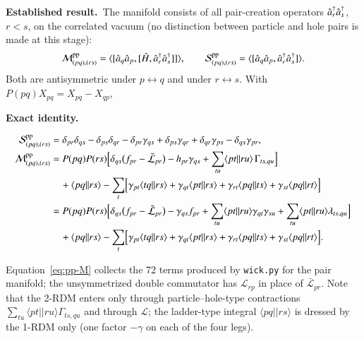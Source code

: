 \documentclass[aip,jcp,reprint,noshowkeys,superscriptaddress]{revtex4-1}
\newcommand{\cre}[1]{\Hat{a}_{#1}^{\dag}}
\newcommand{\ani}[1]{\Hat{a}_{#1}}
\newcommand{\pp}{\text{pp}}
\newcommand{\Lag}{\mathcal{L}}
\newcommand{\sLag}{\bar{\mathcal L}}
\newcommand{\Exact}{\textbf{Exact identity.}\ }
\newcommand{\Established}{\textbf{Established result.}\ }
\begin{document}
\Established The manifold consists of all pair-creation operators
$\cre{r}\cre{s}$, $r<s$, on the correlated vacuum (no distinction between
particle and hole pairs is made at this stage):
\begin{equation}
  \mathcal M^{\pp}_{(pq),(rs)}=\langle[\ani{q}\ani{p},[\hat H,\cre{r}\cre{s}]]\rangle,
  \qquad
  \mathcal S^{\pp}_{(pq),(rs)}=\langle[\ani{q}\ani{p},\cre{r}\cre{s}]\rangle .
  \label{eq:pp-def}
\end{equation}
Both are antisymmetric under $p\leftrightarrow q$ and under
$r\leftrightarrow s$.  With $P(pq)X_{pq}=X_{pq}-X_{qp}$,

\Exact
\begin{widetext}
\begin{align}
  \mathcal S^{\pp}_{(pq),(rs)}&=\delta_{pr}\delta_{qs}-\delta_{ps}\delta_{qr}
  -\delta_{pr}\gamma_{qs}+\delta_{ps}\gamma_{qr}+\delta_{qr}\gamma_{ps}-\delta_{qs}\gamma_{pr},
  \label{eq:pp-S}\\
  \mathcal M^{\pp}_{(pq),(rs)}&=
  P(pq)P(rs)\Bigl[\delta_{qs}\bigl(f_{pr}-\sLag_{pr}\bigr)-h_{pr}\gamma_{qs}
  +\sum_{tu}\langle pt||ru\rangle\,\Gamma_{ts,qu}\Bigr]
  \nonumber\\
  &\quad+\langle pq||rs\rangle
  -\sum_t\Bigl[\gamma_{pt}\langle tq||rs\rangle+\gamma_{qt}\langle pt||rs\rangle
  +\gamma_{rt}\langle pq||ts\rangle+\gamma_{st}\langle pq||rt\rangle\Bigr]
  \label{eq:pp-M}\\
  &=P(pq)P(rs)\Bigl[\delta_{qs}\bigl(f_{pr}-\sLag_{pr}\bigr)-\gamma_{qs}f_{pr}
  +\sum_{tu}\langle pt||ru\rangle\gamma_{qt}\gamma_{su}
  +\sum_{tu}\langle pt||ru\rangle\lambda_{ts,qu}\Bigr]
  \nonumber\\
  &\quad+\langle pq||rs\rangle
  -\sum_t\Bigl[\gamma_{pt}\langle tq||rs\rangle+\gamma_{qt}\langle pt||rs\rangle
  +\gamma_{rt}\langle pq||ts\rangle+\gamma_{st}\langle pq||rt\rangle\Bigr].
  \label{eq:pp-M-cum}
\end{align}
\end{widetext}
Equation~\eqref{eq:pp-M} collects the 72 terms produced by \texttt{wick.py} for
the pair manifold; the unsymmetrized double commutator has $\Lag_{rp}$ in place
of $\sLag_{pr}$.  Note that the 2-RDM enters only through particle--hole-type
contractions $\sum_{tu}\langle pt||ru\rangle\Gamma_{ts,qu}$ and through $\Lag$;
the ladder-type integral $\langle pq||rs\rangle$ is dressed by the 1-RDM only
(one factor $-\gamma$ on each of the four legs).
\end{document}
